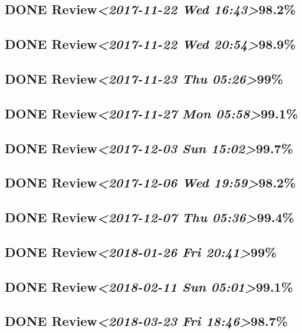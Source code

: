 \documentclass[11pt]{ctexart}
\begin{document}
\subsection{{\bfseries\sffamily DONE} Review\textit{<2017-11-22 Wed 16:43>}98.2\%}
\label{sec:org93bcd7a}
\subsection{{\bfseries\sffamily DONE} Review\textit{<2017-11-22 Wed 20:54>}98.9\%}
\label{sec:org5c35a27}
\subsection{{\bfseries\sffamily DONE} Review\textit{<2017-11-23 Thu 05:26>}99\%}
\label{sec:org1505e53}
\subsection{{\bfseries\sffamily DONE} Review\textit{<2017-11-27 Mon 05:58>}99.1\%}
\label{sec:org588ede0}
\subsection{{\bfseries\sffamily DONE} Review\textit{<2017-12-03 Sun 15:02>}99.7\%}
\label{sec:orgb84ba97}
\subsection{{\bfseries\sffamily DONE} Review\textit{<2017-12-06 Wed 19:59>}98.2\%}
\label{sec:org6a8c445}
\subsection{{\bfseries\sffamily DONE} Review\textit{<2017-12-07 Thu 05:36>}99.4\%}
\label{sec:org76bf4fd}
\subsection{{\bfseries\sffamily DONE} Review\textit{<2018-01-26 Fri 20:41>}99\%}
\label{sec:org98a018e}
\subsection{{\bfseries\sffamily DONE} Review\textit{<2018-02-11 Sun 05:01>}99.1\%}
\label{sec:orgd19e640}
\subsection{{\bfseries\sffamily DONE} Review\textit{<2018-03-23 Fri 18:46>}98.7\%}
\label{sec:orga92651e}
\end{document}
